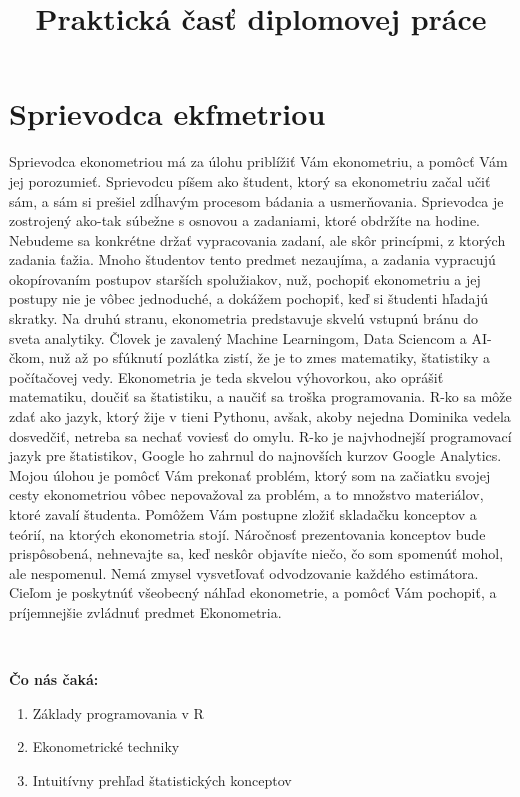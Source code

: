 \documentclass[]{article}
\title{Praktická časť diplomovej práce}
\author{}
\date{\vspace{-2.5em}}
\providecommand{\tightlist}{%
  \setlength{\itemsep}{0pt}\setlength{\parskip}{0pt}}
\begin{document}
\maketitle

\hypertarget{sprievodca-ekfmetriou}{%
\section{Sprievodca ekfmetriou}\label{sprievodca-ekfmetriou}}

Sprievodca ekonometriou má za úlohu priblížiť Vám ekonometriu, a pomôcť
Vám jej porozumieť. Sprievodcu píšem ako študent, ktorý sa ekonometriu
začal učiť sám, a sám si prešiel zdĺhavým procesom bádania a
usmerňovania. Sprievodca je zostrojený ako-tak súbežne s osnovou a
zadaniami, ktoré obdržíte na hodine. Nebudeme sa konkrétne držať
vypracovania zadaní, ale skôr princípmi, z ktorých zadania ťažia. Mnoho
študentov tento predmet nezaujíma, a zadania vypracujú okopírovaním
postupov starších spolužiakov, nuž, pochopiť ekonometriu a jej postupy
nie je vôbec jednoduché, a dokážem pochopiť, keď si študenti hľadajú
skratky. Na druhú stranu, ekonometria predstavuje skvelú vstupnú bránu
do sveta analytiky. Človek je zavalený Machine Learningom, Data Sciencom
a AI-čkom, nuž až po sfúknutí pozlátka zistí, že je to zmes matematiky,
štatistiky a počítačovej vedy. Ekonometria je teda skvelou výhovorkou,
ako oprášiť matematiku, doučiť sa štatistiku, a naučiť sa troška
programovania. R-ko sa môže zdať ako jazyk, ktorý žije v tieni Pythonu,
avšak, akoby nejedna Dominika vedela dosvedčiť, netreba sa nechať
voviesť do omylu. R-ko je najvhodnejší programovací jazyk pre
štatistikov, Google ho zahrnul do najnovších kurzov Google Analytics.
Mojou úlohou je pomôcť Vám prekonať problém, ktorý som na začiatku
svojej cesty ekonometriou vôbec nepovažoval za problém, a to množstvo
materiálov, ktoré zavalí študenta. Pomôžem Vám postupne zložiť skladačku
konceptov a teórií, na ktorých ekonometria stojí. Náročnosť
prezentovania konceptov bude prispôsobená, nehnevajte sa, keď neskôr
objavíte niečo, čo som spomenúť mohol, ale nespomenul. Nemá zmysel
vysvetľovať odvodzovanie každého estimátora. Cieľom je poskytnúť
všeobecný náhľad ekonometrie, a pomôcť Vám pochopiť, a príjemnejšie
zvládnuť predmet Ekonometria.

~

\textbf{Čo nás čaká:}

\begin{enumerate}
\def\labelenumi{\arabic{enumi}.}
\tightlist
\item
  Základy programovania v R
\item
  Ekonometrické techniky
\item
  Intuitívny prehľad štatistických konceptov
\end{enumerate}
\end{document}
